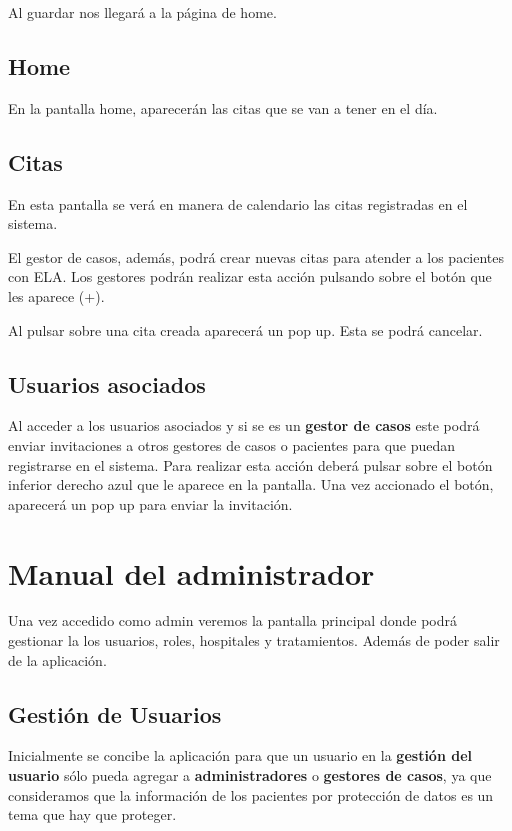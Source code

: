 Al guardar nos llegará a la página de home.


\subsection{Home}
En la pantalla home, aparecerán las citas que se van a tener en el día.

\subsection{Citas}
En esta pantalla se verá en manera de calendario las citas registradas en el sistema. 

El gestor de casos, además, podrá crear nuevas citas para atender a los pacientes con ELA. Los gestores podrán realizar esta acción pulsando sobre el botón que les aparece (+).

Al pulsar sobre una cita creada aparecerá un pop up. Esta se podrá cancelar.

\subsection{Usuarios asociados}
Al acceder a los usuarios asociados y si se es un \textbf{gestor de casos} este podrá enviar invitaciones a otros gestores de casos o pacientes para que puedan registrarse en el sistema. Para realizar esta acción deberá pulsar sobre el botón inferior derecho azul que le aparece en la pantalla. Una vez accionado el botón, aparecerá un pop up para enviar la invitación.

\section{Manual del administrador}
Una vez accedido como admin veremos la pantalla principal donde podrá gestionar la los usuarios, roles, hospitales y tratamientos. Además de poder salir de la aplicación.

\subsection{Gestión de Usuarios}
Inicialmente se concibe la aplicación para que un usuario en la \textbf{gestión del usuario} sólo pueda agregar a \textbf{administradores} o \textbf{gestores de casos}, ya que consideramos que la información de los pacientes por protección de datos es un tema que hay que proteger.

